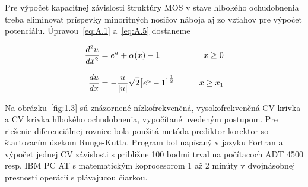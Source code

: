 Pre výpočet kapacitnej závislosti štruktúry MOS v stave hlbokého
ochudobnenia treba eliminovať príspevky minoritných nosičov náboja aj
zo vzťahov pre výpočet potenciálu. Úpravou~\ref{eq:A.1} a~\ref{eq:A.5}
dostaneme

\begin{samepage}
\begin{subequations}\label{eq:A.14}
  \begin{align}
  \frac{d^2u}{dx^2} &= {e^u + \alpha(x)-1} \qquad &{x\ge0}                                     \label{eq:A.14a} \\[0.3cm]
  \frac{du}{dx} &= -\frac{u}{|u|} \sqrt{2} \big{[e^u-1\big]}^{\frac{1}{2}} \qquad &{x\ge{x_1}} \label{eq:A.14b}
  \end{align}
\end{subequations}
\end{samepage}

Na obrázku~\ref{fig:1.3} sú znázornené nízkofrekvenčná,
vysokofrekvenčná CV krivka a CV krivka hlbokého ochudobnenia,
vypočítané uvedeným postupom. Pre riešenie diferenciálnej rovnice bola
použitá metóda prediktor-korektor so štartovacím úsekom
Runge-Kutta. Program bol napísaný v jazyku Fortran a výpočet jednej CV
závislosti s približne 100 bodmi trval na počítacoch ADT 4500
resp. IBM PC AT s matematickým koprocesorom 1 až 2 minúty v
dvojnásobnej presnosti operácií s plávajucou čiarkou.
